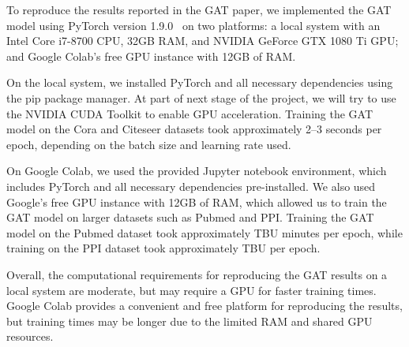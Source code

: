 To reproduce the results reported in the GAT paper, we implemented the GAT model using PyTorch version 1.9.0~\cite{paszke2019pytorch} on two platforms:
a local system with an Intel Core i7-8700 CPU, 32GB RAM, and NVIDIA GeForce GTX 1080 Ti GPU; and Google Colab's free GPU instance with 12GB of RAM\@.

On the local system, we installed PyTorch and all necessary dependencies using the pip package manager.
At part of next stage of the project, we will try to use the NVIDIA CUDA Toolkit to enable GPU acceleration.
Training the GAT model on the Cora and Citeseer datasets took approximately 2--3 seconds per epoch, depending on the
batch size and learning rate used.

On Google Colab, we used the provided Jupyter notebook environment, which includes PyTorch and all necessary dependencies pre-installed.
We also used Google's free GPU instance with 12GB of RAM, which allowed us to train the GAT model on larger datasets such as Pubmed and PPI.
Training the GAT model on the Pubmed dataset took approximately TBU minutes per epoch, while training on the PPI
dataset took approximately TBU per epoch.

Overall, the computational requirements for reproducing the GAT results on a local system are moderate, but may require a GPU for faster training times.
Google Colab provides a convenient and free platform for reproducing the results, but training times may be longer due to the limited RAM and shared GPU resources.
